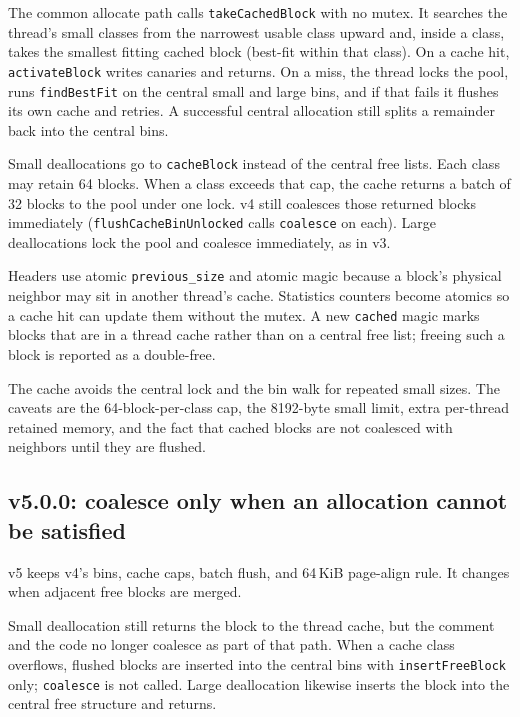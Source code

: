 The common allocate path calls \texttt{takeCachedBlock} with no mutex.
It searches the thread's small classes from the narrowest usable class upward
and, inside a class, takes the smallest fitting cached block (best-fit within
that class).
On a cache hit, \texttt{activateBlock} writes canaries and returns.
On a miss, the thread locks the pool, runs \texttt{findBestFit} on the central
small and large bins, and if that fails it flushes its own cache and retries.
A successful central allocation still splits a remainder back into the central
bins.

Small deallocations go to \texttt{cacheBlock} instead of the central free lists.
Each class may retain 64 blocks.
When a class exceeds that cap, the cache returns a batch of 32 blocks to the
pool under one lock.
v4 still coalesces those returned blocks immediately
(\texttt{flushCacheBinUnlocked} calls \texttt{coalesce} on each).
Large deallocations lock the pool and coalesce immediately, as in v3.

Headers use atomic \texttt{previous\_size} and atomic magic because a block's
physical neighbor may sit in another thread's cache.
Statistics counters become atomics so a cache hit can update them without the
mutex.
A new \texttt{cached} magic marks blocks that are in a thread cache rather than
on a central free list; freeing such a block is reported as a double-free.

The cache avoids the central lock and the bin walk for repeated small sizes.
The caveats are the 64-block-per-class cap, the 8192-byte small limit, extra
per-thread retained memory, and the fact that cached blocks are not coalesced
with neighbors until they are flushed.

\subsection{v5.0.0: coalesce only when an allocation cannot be satisfied}

v5 keeps v4's bins, cache caps, batch flush, and 64\,KiB page-align rule.
It changes when adjacent free blocks are merged.

Small deallocation still returns the block to the thread cache, but the comment
and the code no longer coalesce as part of that path.
When a cache class overflows, flushed blocks are inserted into the central bins
with \texttt{insertFreeBlock} only; \texttt{coalesce} is not called.
Large deallocation likewise inserts the block into the central free structure
and returns.


